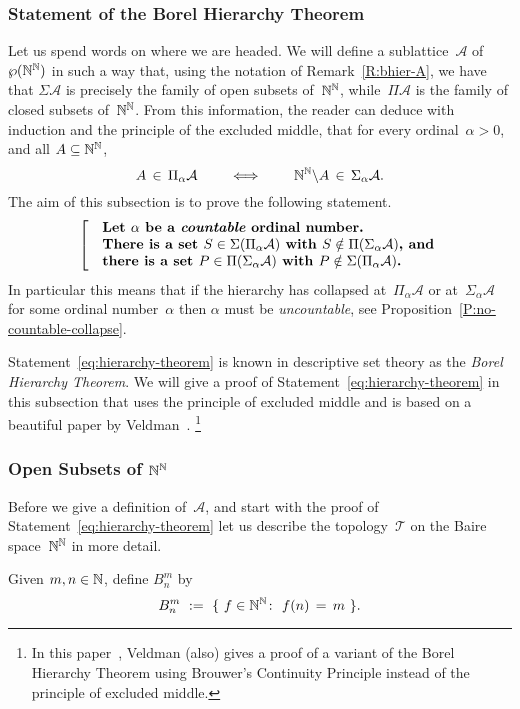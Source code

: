 \subsubsection{Statement of the Borel Hierarchy Theorem}$\,$\\
Let us spend words on where we are headed.
We will define a sublattice~$\mathcal{A}$
of~$\wp(\mathbb{N}^{\mathbb{N}})$
in such a way that,
using the notation of Remark~\ref{R:bhier-A},
we have that
$\Sigma \mathcal{A}$
is  precisely the family of open subsets of~$\mathbb{N}^{\mathbb{N}}$,
while~$\Pi \mathcal{A}$ is the family
of closed subsets of~$\mathbb{N}^{\mathbb{N}}$.
From this information,
the reader can deduce with induction and the principle
of the excluded middle, that for every ordinal~$\alpha>0$,
and all $A\subseteq\mathbb{N}^{\mathbb{N}}$, 
\begin{equation}
\label{eq:bhier-complement}
A \,\in\, \Pi_\alpha \mathcal{A}
\qquad\iff\qquad
\mathbb{N}^{\mathbb{N}}\backslash A \,\in\, \Sigma_\alpha \mathcal{A}.
\end{equation}
The aim of this subsection
is to prove the following statement.
\begin{equation}
\label{eq:hierarchy-theorem}
\left[\quad
\begin{minipage}{.7\columnwidth}
\textbf{%
Let~$\alpha$ be a \emph{countable} ordinal number.\\
There is a set~$S\in \Sigma(\Pi_\alpha\mathcal{A})$
with $S\notin \Pi(\Sigma_\alpha\mathcal{A})$, and \\
there is a set $P\in\Pi(\Sigma_\alpha\mathcal{A})$
with $P\notin \Sigma(\Pi_\alpha\mathcal{A})$.}
\end{minipage}
\right.
\end{equation}
In particular
this means that if the hierarchy has collapsed
at~$\Pi_\alpha\mathcal{A}$
or at~$\Sigma_\alpha\mathcal{A}$
for some ordinal number~$\alpha$
then $\alpha$ must be \emph{uncountable},
see Proposition~\ref{P:no-countable-collapse}.

Statement~\eqref{eq:hierarchy-theorem}
is known in descriptive set theory
as the \emph{Borel Hierarchy Theorem}.
We will give a proof of Statement~\eqref{eq:hierarchy-theorem}
 in this subsection that
uses the principle of excluded middle
and is based on a beautiful paper by Veldman~\cite[paragraph 5]{Veldman08}.%
\footnote{
In this paper~\cite{Veldman08},
Veldman (also) gives
a proof of a variant of the Borel Hierarchy Theorem
using Brouwer's Continuity Principle
instead of the principle of excluded middle.}

\subsubsection{Open Subsets of $\mathbb{N}^{\mathbb{N}}$}$\,$\label{SSS:bhier-open}\\
Before we give a definition of~$\mathcal{A}$,
and start with the proof of Statement~\eqref{eq:hierarchy-theorem}
let us describe the topology~$\mathcal{T}$ 
on the Baire space~$\mathbb{N}^{\mathbb{N}}$ in more detail.
\begin{dfn}
Given $m,n\in\mathbb{N}$, define $B^m_n$ by
\begin{equation*}
B_n^m\ :=\ \{ \ f\in\mathbb{N}^{\mathbb{N}}\colon\  f(n) \,=\, m \ \}.
\end{equation*}
\end{dfn}

